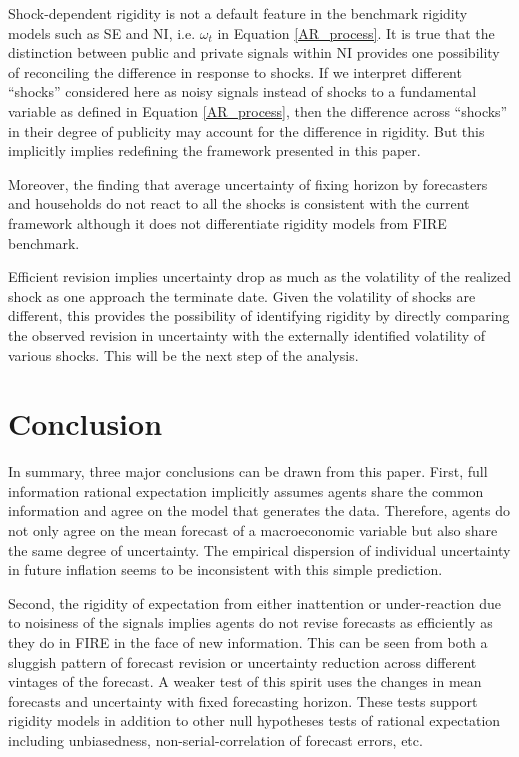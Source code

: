 \documentclass[12pt]{article}
\begin{document}
	Shock-dependent rigidity is not a default feature in the benchmark rigidity models such as SE and NI, i.e. $\omega_t$ in Equation \ref{AR_process}. It is true that the distinction between public and private signals within NI provides one possibility of reconciling the difference in response to shocks.  If we interpret different ``shocks'' considered here as noisy signals instead of shocks to a fundamental variable as defined in Equation \ref{AR_process}, then the difference across ``shocks'' in their degree of publicity may account for the difference in rigidity.  But this implicitly implies redefining the framework presented in this paper. 
	
	Moreover, the finding that average uncertainty of fixing horizon by forecasters and households do not react to all the shocks is consistent with the current framework although it does not differentiate rigidity models from FIRE benchmark.  
	
	Efficient revision implies uncertainty drop as much as the volatility of the realized shock as one approach the terminate date. Given the volatility of shocks are different, this provides the possibility of identifying rigidity by directly comparing the observed revision in uncertainty with the externally identified volatility of various shocks. This will be the next step of the analysis.  
	
	\section{Conclusion}\label{Conclusion}
	
	In summary, three major conclusions can be drawn from this paper.  First, full information rational expectation implicitly assumes agents share the common information and agree on the model that generates the data. Therefore, agents do not only agree on the mean forecast of a macroeconomic variable but also share the same degree of uncertainty. The empirical dispersion of individual uncertainty in future inflation seems to be inconsistent with this simple prediction. 
	
	Second, the rigidity of expectation from either inattention or under-reaction due to noisiness of the signals implies agents do not revise forecasts as efficiently as they do in FIRE in the face of new information. This can be seen from both a sluggish pattern of forecast revision or uncertainty reduction across different vintages of the forecast. A weaker test of this spirit uses the changes in mean forecasts and uncertainty with fixed forecasting horizon. These tests support rigidity models in addition to other null hypotheses tests of rational expectation including unbiasedness,  non-serial-correlation of forecast errors, etc.
	
\end{document}
